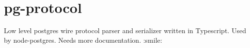 \chapter{pg-\/protocol}
\hypertarget{md_node__modules_2pg-protocol_2_r_e_a_d_m_e}{}\label{md_node__modules_2pg-protocol_2_r_e_a_d_m_e}
\label{md_node__modules_2pg-protocol_2_r_e_a_d_m_e_autotoc_md1536}%
%


Low level postgres wire protocol parser and serializer written in Typescript. Used by node-\/postgres. Needs more documentation. \+:smile\+: 